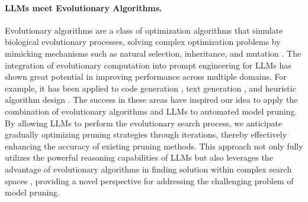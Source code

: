 \paragraph{LLMs meet Evolutionary Algorithms.}
Evolutionary algorithms are a class of optimization algorithms that simulate biological evolutionary processes, solving complex optimization problems by mimicking mechanisms such as natural selection, inheritance, and mutation \citep{eiben2015evolutionary, bartz2014evolutionary}. The integration of evolutionary computation into prompt engineering for LLMs has shown great potential in improving performance across multiple domains. For example, it has been applied to code generation \citep{liventsev2023fully, lehman2023evolution}, text generation \citep{guo2023connecting, xu2023wizardlm}, and heuristic algorithm design \citep{liu2024evolution, romera2024mathematical}. The success in these areas have inspired our idea to apply the combination of evolutionary algorithms and LLMs to automated model pruning. By allowing LLMs to perform the evolutionary search process, we anticipate gradually optimizing pruning strategies through iterations, thereby effectively enhancing the accuracy of existing pruning methods. This approach not only fully utilizes the powerful reasoning capabilities of LLMs \citep{huang2022towards} but also leverages the advantage of evolutionary algorithms in finding solution within complex search spaces \citep{whitley2001overview}, providing a novel perspective for addressing the challenging problem of model pruning.